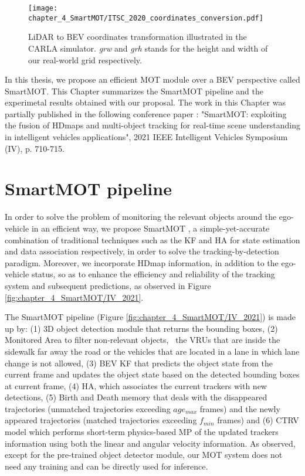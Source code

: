 \begin{figure}[h]
	\centering
	\captionsetup{justification=justified}
	\texttt{[image: chapter\_4\_SmartMOT/ITSC\_2020\_coordinates\_conversion.pdf]}
	\caption[LiDAR to BEV coordinates transformation illustrated in the CARLA simulator]{\ac{LiDAR} to \ac{BEV} coordinates transformation illustrated in the CARLA simulator. \textit{grw} and \textit{grh} stands for the height and width of our real-world grid respectively.}
	\label{fig:chapter_4_SmartMOT/ITSC_2020_coordinates_conversion}
\end{figure}

In this thesis, we propose an efficient \ac{MOT} module over a \ac{BEV} perspective called SmartMOT. This Chapter summarizes the SmartMOT pipeline and the experimetal results obtained with our proposal. The work in this Chapter was partially published in the following conference paper \cite{gomez2021smartmot}: "SmartMOT: exploiting the fusion of \acp{HDmap} and multi-object tracking for real-time scene understanding in intelligent vehicles applications", 2021 IEEE Intelligent Vehicles Symposium (IV), p. 710-715. 

\section{SmartMOT pipeline}
\label{sec:4_smartmot}

In order to solve the problem of monitoring the relevant objects around the ego-vehicle in an efficient way, we propose SmartMOT \cite{gomez2021smartmot}, a simple-yet-accurate combination of traditional techniques such as the \ac{KF} \cite{kalman1960new} and \ac{HA} \cite{kuhn1955hungarian} for state estimation and data association respectively, in order to solve the tracking-by-detection paradigm. Moreover, we incorporate \ac{HDmap} information, in addition to the ego-vehicle status, so as to enhance the efficiency and reliability of the tracking system and subsequent predictions, as observed in Figure \ref{fig:chapter_4_SmartMOT/IV_2021}. 

The SmartMOT pipeline (Figure \ref{fig:chapter_4_SmartMOT/IV_2021}) is made up by: (1) 3D object detection module that returns the bounding boxes, (2) Monitored Area to filter non-relevant objects, \eg \ the \acfp{VRU} that are inside the sidewalk far away the road or the vehicles that are located in a lane in which lane change is not allowed, (3) \acf{BEV} \acf{KF} that predicts the object state from the current frame and updates the object state based on the detected bounding boxes at current frame, (4) \acf{HA}, which associates the current trackers with new detections, (5) Birth and Death memory that deals with the disappeared trajectories (unmatched trajectories exceeding ${age_{max}}$ frames) and the newly appeared trajectories (matched trajectories exceeding ${f_{min}}$ frames) and (6) \ac{CTRV} model which performs short-term physics-based \ac{MP} of the updated trackers information using both the linear and angular velocity information. As observed, except for the pre-trained object detector module, our \ac{MOT} system does not need any training and can be directly used for inference.

